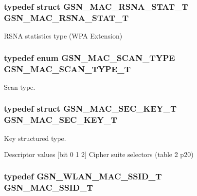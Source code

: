 \hypertarget{a00642_ga72bcd48cbb7fbabbe7a09a5271e1723e}{
\subsubsection[{GSN\_\-MAC\_\-RSNA\_\-STAT\_\-T}]{\setlength{\rightskip}{0pt plus 5cm}typedef struct {\bf GSN\_\-MAC\_\-RSNA\_\-STAT\_\-T}  {\bf GSN\_\-MAC\_\-RSNA\_\-STAT\_\-T}}}
\label{a00642_ga72bcd48cbb7fbabbe7a09a5271e1723e}


RSNA statistics type (WPA Extension) 

\hypertarget{a00642_ga25b1673dd1960a988e38a58156a53fd2}{
\subsubsection[{GSN\_\-MAC\_\-SCAN\_\-TYPE\_\-T}]{\setlength{\rightskip}{0pt plus 5cm}typedef enum {\bf GSN\_\-MAC\_\-SCAN\_\-TYPE}  {\bf GSN\_\-MAC\_\-SCAN\_\-TYPE\_\-T}}}
\label{a00642_ga25b1673dd1960a988e38a58156a53fd2}


Scan type. 

\hypertarget{a00642_ga47d838a4f5db3c6d8039dac8b4726479}{
\subsubsection[{GSN\_\-MAC\_\-SEC\_\-KEY\_\-T}]{\setlength{\rightskip}{0pt plus 5cm}typedef struct {\bf GSN\_\-MAC\_\-SEC\_\-KEY\_\-T}  {\bf GSN\_\-MAC\_\-SEC\_\-KEY\_\-T}}}
\label{a00642_ga47d838a4f5db3c6d8039dac8b4726479}


Key structured type. 

Descriptor values \mbox{[}bit 0 1 2\mbox{]} Cipher suite selectors (table 2 p20) \hypertarget{a00642_gaa99e8c0b151cd3a4b954dda1b8d45170}{
\subsubsection[{GSN\_\-MAC\_\-SSID\_\-T}]{\setlength{\rightskip}{0pt plus 5cm}typedef {\bf GSN\_\-WLAN\_\-MAC\_\-SSID\_\-T} {\bf GSN\_\-MAC\_\-SSID\_\-T}}}
\label{a00642_gaa99e8c0b151cd3a4b954dda1b8d45170}


